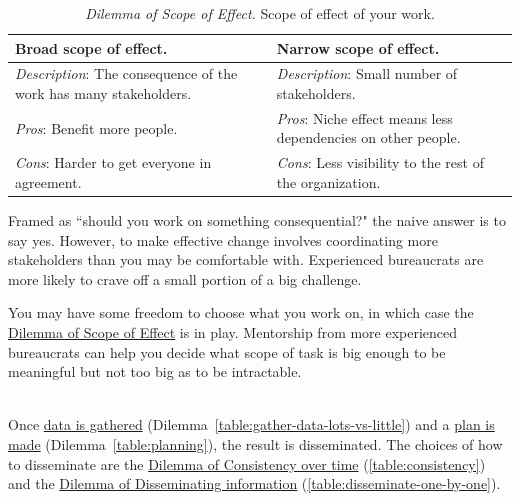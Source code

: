 \begin{center}
\begin{table}[H] %
\begin{tabular}{ | m{\dilemmatablewidth}| m{\dilemmatablewidth} | } 
  \hline
  \textbf{Broad scope of effect.} &
  \textbf{Narrow scope of effect.} \\
  \hline
  \textit{Description}: The consequence of the work has many stakeholders. &
  \textit{Description}: Small number of stakeholders. \\  
  \hline
  \textit{Pros}: Benefit more people. &
  \textit{Pros}: Niche effect means less dependencies on other people. \\
  \hline
  \textit{Cons}: Harder to get everyone in agreement. & 
  \textit{Cons}: Less visibility to the rest of the organization. \\
  \hline
\end{tabular}
\caption{
\textit{Dilemma of Scope of Effect.}
Scope of effect of your work. 
}
\end{table}
\label{table:scope-broad-vs-narrow}
\end{center}

Framed as ``should you work on something consequential?" the naive answer is to say yes. However, to make effective change involves coordinating more stakeholders than you may be comfortable with. Experienced bureaucrats are more likely to crave off a small portion of a big challenge.

You may have some freedom to choose what you work on, in which case the \hyperref[table:scope-broad-vs-narrow]{Dilemma of Scope of Effect} is in play. Mentorship from more experienced bureaucrats can help you decide what scope of task is big enough to be meaningful but not too big as to be intractable.



\ \\

Once \hyperref[table:gather-data-lots-vs-little]{data is gathered} (Dilemma~\ref{table:gather-data-lots-vs-little}) and a \hyperref[table:planning]{plan is made} (Dilemma~\ref{table:planning}), the result is disseminated. The choices of how to disseminate are the \hyperref[table:consistency]{Dilemma of Consistency over time} (\ref{table:consistency}) and the \hyperref[table:disseminate-one-by-one]{Dilemma of Disseminating information} (\ref{table:disseminate-one-by-one}).

